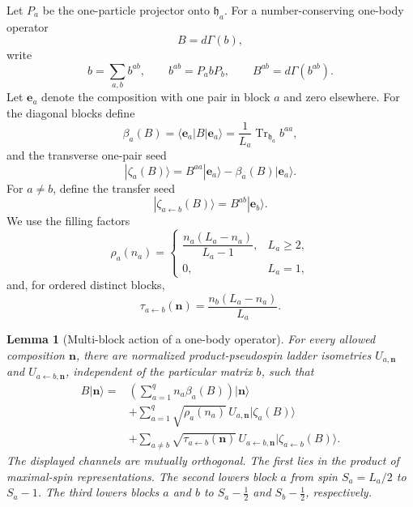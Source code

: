 \documentclass[11pt]{article}
\numberwithin{equation}{section}
\newtheorem{lemma}[theorem]{Lemma}
\newcommand{\bn}{\mathbf n}
\newcommand{\be}{\mathbf e}
\newcommand{\Tr}{\operatorname{Tr}}
\begin{document}
Let $P_a$ be the one-particle projector onto $\mathfrak h_a$.  For a number-conserving one-body operator
\begin{equation}
 B=d\Gamma(b),
 \label{eq:B-generic}
\end{equation}
write
\begin{equation}
 b=\sum_{a,b}b^{ab},
 \qquad
 b^{ab}=P_abP_b,
 \qquad
 B^{ab}=d\Gamma(b^{ab}).
 \label{eq:block-B}
\end{equation}
Let $\be_a$ denote the composition with one pair in block $a$ and zero elsewhere.  For the diagonal blocks define
\begin{equation}
 \beta_a(B)
 =\langle\be_a|B|\be_a\rangle
 =\frac1{L_a}\Tr_{\mathfrak h_a}b^{aa},
 \label{eq:beta-def}
\end{equation}
and the transverse one-pair seed
\begin{equation}
 |\zeta_a(B)\rangle
 =B^{aa}|\be_a\rangle-\beta_a(B)|\be_a\rangle.
 \label{eq:zeta-diag}
\end{equation}
For $a\ne b$, define the transfer seed
\begin{equation}
 |\zeta_{a\leftarrow b}(B)\rangle
 =B^{ab}|\be_b\rangle.
 \label{eq:zeta-transfer}
\end{equation}
We use the filling factors
\begin{equation}
 \rho_a(n_a)=
 \begin{cases}
 \dfrac{n_a(L_a-n_a)}{L_a-1},&L_a\ge2,\\[0.8em]
 0,&L_a=1,
 \end{cases}
 \label{eq:rho-block}
\end{equation}
and, for ordered distinct blocks,
\begin{equation}
 \tau_{a\leftarrow b}(\bn)
 =\frac{n_b(L_a-n_a)}{L_a}.
 \label{eq:tau-block}
\end{equation}

\begin{lemma}[Multi-block action of a one-body operator]
\label{lem:multiblock-action}
For every allowed composition $\bn$, there are normalized product-pseudospin ladder isometries $U_{a,\bn}$ and $U_{a\leftarrow b,\bn}$, independent of the particular matrix $b$, such that
\begin{align}
 B|\bn\rangle
 ={}&\left(\sum_{a=1}^q n_a\beta_a(B)\right)|\bn\rangle
 \nonumber\\
 &+\sum_{a=1}^q\sqrt{\rho_a(n_a)}\,
 U_{a,\bn}|\zeta_a(B)\rangle
 \nonumber\\
 &+\sum_{a\ne b}\sqrt{\tau_{a\leftarrow b}(\bn)}\,
 U_{a\leftarrow b,\bn}|\zeta_{a\leftarrow b}(B)\rangle.
 \label{eq:multiblock-action}
\end{align}
The displayed channels are mutually orthogonal.  The first lies in the product of maximal-spin representations.  The second lowers block $a$ from spin $S_a=L_a/2$ to $S_a-1$.  The third lowers blocks $a$ and $b$ to $S_a-\tfrac12$ and $S_b-\tfrac12$, respectively.
\end{lemma}
\end{document}
